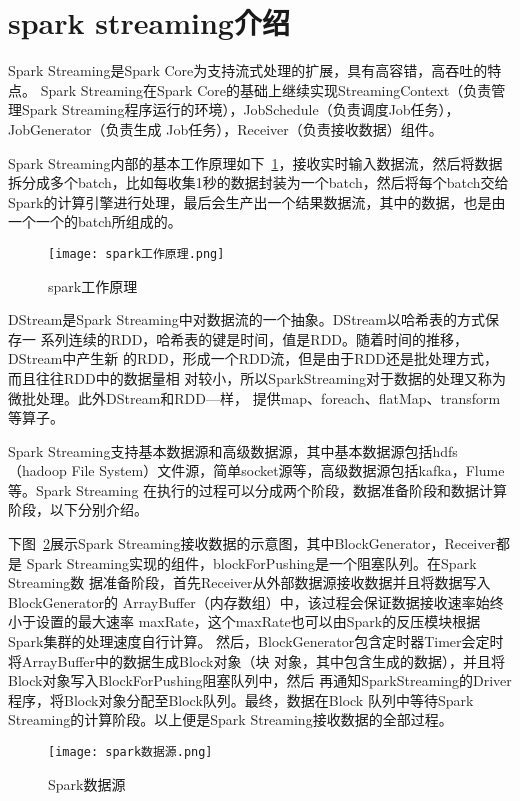 \section{spark streaming介绍}
Spark Streaming是Spark Core为支持流式处理的扩展，具有高容错，高吞吐的特点。
Spark Streaming在Spark Core的基础上继续实现StreamingContext（负责管理Spark Streaming程序运行的环境），JobSchedule（负责调度Job任务），JobGenerator（负责生成
Job任务），Receiver（负责接收数据）组件。

Spark Streaming内部的基本工作原理如下~\ref{fig:spark工作原理}，接收实时输入数据流，然后将数据拆分成多个batch，比如每收集1秒的数据封装为一个batch，然后将每个batch交给Spark的计算引擎进行处理，最后会生产出一个结果数据流，其中的数据，也是由一个一个的batch所组成的。

\begin{figure}
    \centering
    \texttt{[image: spark工作原理.png]}
    \caption{spark工作原理}
    \label{fig:spark工作原理}
  \end{figure}

DStream是Spark Streaming中对数据流的一个抽象。DStream以哈希表的方式保存一
系列连续的RDD，哈希表的键是时间，值是RDD。随着时间的推移，DStream中产生新
的RDD，形成一个RDD流，但是由于RDD还是批处理方式，而且往往RDD中的数据量相
对较小，所以SparkStreaming对于数据的处理又称为微批处理。此外DStream和RDD—样，
提供map、foreach、flatMap、transform等算子。

Spark Streaming支持基本数据源和高级数据源，其中基本数据源包括hdfs（hadoop File System）文件源，简单socket源等，高级数据源包括kafka，Flume等。Spark Streaming
在执行的过程可以分成两个阶段，数据准备阶段和数据计算阶段，以下分别介绍。

下图~\ref{fig:spark}展示Spark Streaming接收数据的示意图，其中BlockGenerator，Receiver都是
Spark Streaming实现的组件，blockForPushing是一个阻塞队列。在Spark Streaming数
据准备阶段，首先Receiver从外部数据源接收数据并且将数据写入BlockGenerator的
ArrayBuffer（内存数组）中，该过程会保证数据接收速率始终小于设置的最大速率
maxRate，这个maxRate也可以由Spark的反压模块根据Spark集群的处理速度自行计算。
然后，BlockGenerator包含定时器Timer会定时将ArrayBuffer中的数据生成Block对象（块
对象，其中包含生成的数据），并且将Block对象写入BlockForPushing阻塞队列中，然后
再通知SparkStreaming的Driver程序，将Block对象分配至Block队列。最终，数据在Block
队列中等待Spark Streaming的计算阶段。以上便是Spark Streaming接收数据的全部过程。
\begin{figure}
    \centering
    \texttt{[image: spark数据源.png]}
    \caption{Spark数据源}
    \label{fig:spark}
  \end{figure}


